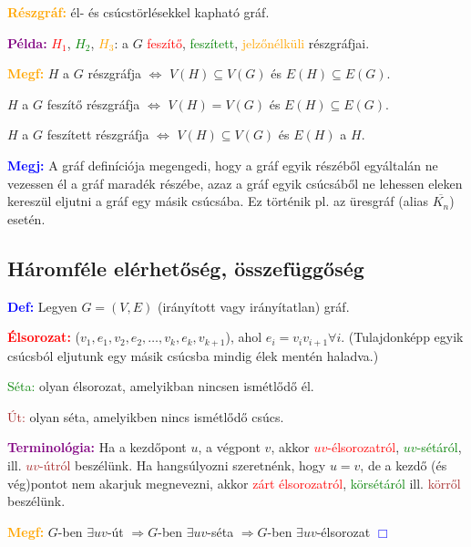 \documentclass[../szamtud.tex]{subfiles}
\begin{document}
        \textcolor{orange}{\textbf{Részgráf:}} él- és csúcstörlésekkel kapható gráf.

        \textcolor{purple}{\textbf{Példa:}} \textcolor{red}{$H_1$}, \textcolor{green}{$H_2$}, \textcolor{orange}{$H_3$}: a $G$ \textcolor{red}{feszítő}, \textcolor{green}{feszített}, \textcolor{orange}{jelzőnélküli} részgráfjai.

        \textcolor{orange}{\textbf{Megf:}} $H$ a $G$ részgráfja $\Longleftrightarrow$ $V(H) \subseteq V(G)$ és $E(H) \subseteq E(G)$.

        $H$ a $G$ feszítő részgráfja $\Longleftrightarrow$ $V(H) = V(G)$ és $E(H) \subseteq E(G)$.

        $H$ a $G$ feszített részgráfja $\Longleftrightarrow$ $V(H) \subseteq V(G)$ és $E(H)$ a $H$.

        \textcolor{blue}{\textbf{Megj:}} A gráf definíciója megengedi, hogy a gráf egyik részéből egyáltalán ne vezessen él a gráf maradék részébe, azaz a gráf egyik csúcsáből ne lehessen eleken kereszül eljutni a gráf egy másik csúcsába. Ez történik pl. az üresgráf (alias $\overline{K_n}$) esetén.

    \subsection{Háromféle elérhetőség, összefüggőség}

        \textcolor{blue}{\textbf{Def:}} Legyen $G = (V,E)$ (irányított vagy irányítatlan) gráf.

        \textcolor{red}{\textbf{Élsorozat:}} ($v_1,e_1,v_2,e_2,\dots,v_k,e_k,v_{k+1}$), ahol $e_i=v_i v_{i+1}\forall i$. (Tulajdonképp egyik csúcsból eljutunk egy másik csúcsba mindig élek mentén haladva.)

        \textcolor{green}{Séta:} olyan élsorozat, amelyikban nincsen ismétlődő él.

        \textcolor{brown}{Út:} olyan séta, amelyikben nincs ismétlődő csúcs.

        \textcolor{purple}{\textbf{Terminológia:}} Ha a kezdőpont $u$, a végpont $v$, akkor \textcolor{red}{$uv$-élsorozatról}, \textcolor{green}{$uv$-sétáról}, ill. \textcolor{brown}{$uv$-útról} beszélünk. Ha hangsúlyozni szeretnénk, hogy $u = v$, de a kezdő (és vég)pontot nem akarjuk megnevezni, akkor \textcolor{red}{zárt élsorozatról}, \textcolor{green}{körsétáról} ill. \textcolor{brown}{körről} beszélünk.

        \textcolor{orange}{\textbf{Megf:}} $G$-ben $\exists uv$-út $\Rightarrow G$-ben $\exists uv$-séta $\Rightarrow G$-ben $\exists uv$-élsorozat \textcolor{blue}{$\Box$}
\end{document}
